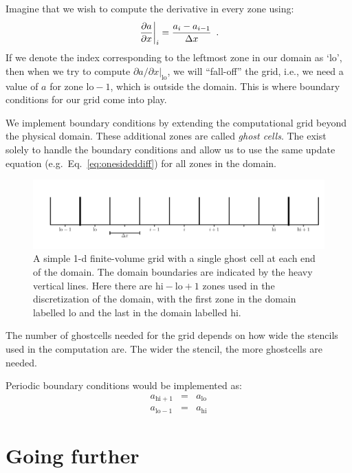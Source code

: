 Imagine that we wish to compute the derivative in every zone using:
\begin{equation}
\left . \frac{\partial a}{\partial x} \right |_i = \frac{a_i - a_{i-1}}{\Delta x} \enskip .
\label{eq:onesideddiff}
\end{equation}
If we denote the index corresponding to the leftmost zone in our
domain as `lo', then when we try to compute ${\partial a}/{\partial x}
|_\mathrm{lo}$, we will ``fall-off'' the grid, i.e., we need a value
of $a$ for zone $\mathrm{lo}-1$, which is outside the domain.  This is
where boundary conditions for our grid come into play.  

We implement boundary conditions by extending the computational grid
beyond the physical domain.  These additional zones are called {\em
  ghost cells}.  The exist solely to handle the boundary conditions
and allow us to use the same update equation (e.g.\ Eq.~\ref{eq:onesideddiff})
for all zones in the domain.

\begin{figure}[h]
\centering
\includegraphics[width=6.0in]{simplegrid_gc}
\caption{A simple 1-d finite-volume grid with a single ghost cell at
  each end of the domain.  The domain boundaries are indicated by the
  heavy vertical lines.  Here there are $\mathrm{hi}-\mathrm{lo}+1$
  zones used in the discretization of the domain, with the first zone
  in the domain labelled $\mathrm{lo}$ and the last in the domain
  labelled $\mathrm{hi}$.}
\end{figure}

The number of ghostcells needed for the grid depends on how wide the
stencils used in the computation are.  The wider the stencil, the more
ghostcells are needed.

Periodic boundary conditions would be implemented as:
\begin{eqnarray}
a_{\mathrm{hi}+1} &=& a_\mathrm{lo} \\
a_{\mathrm{lo}-1} &=& a_\mathrm{hi}
\end{eqnarray}



\section{Going further}

